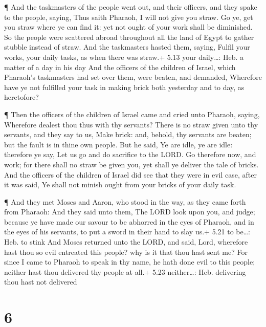  ¶ And the taskmasters of the people went out, and their
officers, and they spake to the people, saying, Thus saith Pharaoh, I
will not give you straw.  Go ye, get you straw where ye can
find it: yet not ought of your work shall be diminished. 
So the people were scattered abroad throughout all the land of Egypt to
gather stubble instead of straw.  And the taskmasters
hasted them, saying, Fulfil your works, your daily tasks, as when there
was straw.+ 5.13 your daily\ldots: Heb. a matter of a day in his day
 And the officers of the children of Israel, which
Pharaoh's taskmasters had set over them, were beaten, and demanded,
Wherefore have ye not fulfilled your task in making brick both yesterday
and to day, as heretofore?

 ¶ Then the officers of the children of Israel came and
cried unto Pharaoh, saying, Wherefore dealest thou thus with thy
servants?  There is no straw given unto thy servants, and
they say to us, Make brick: and, behold, thy servants are beaten; but
the fault is in thine own people.  But he said, Ye are
idle, ye are idle: therefore ye say, Let us go and do sacrifice to the
LORD.  Go therefore now, and work; for there shall no straw
be given you, yet shall ye deliver the tale of bricks.  And
the officers of the children of Israel did see that they were in evil
case, after it was said, Ye shall not minish ought from your bricks of
your daily task.

 ¶ And they met Moses and Aaron, who stood in the way, as
they came forth from Pharaoh:  And they said unto them, The
LORD look upon you, and judge; because ye have made our savour to be
abhorred in the eyes of Pharaoh, and in the eyes of his servants, to put
a sword in their hand to slay us.+ 5.21 to be\ldots: Heb. to stink
 And Moses returned unto the LORD, and said, Lord,
wherefore hast thou so evil entreated this people? why is it that thou
hast sent me?  For since I came to Pharaoh to speak in thy
name, he hath done evil to this people; neither hast thou delivered thy
people at all.+ 5.23 neither\ldots: Heb. delivering thou hast not
delivered

\hypertarget{section-5}{%
\section{6}\label{section-5}}

